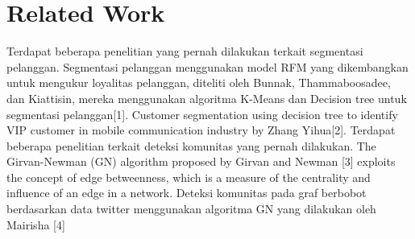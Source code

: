 \documentclass[conference]{IEEEtran}
\begin{document}
%





\section{Related Work}
Terdapat beberapa penelitian yang pernah dilakukan terkait segmentasi pelanggan. Segmentasi pelanggan menggunakan model RFM yang dikembangkan untuk mengukur loyalitas pelanggan, diteliti oleh Bunnak, Thammaboosadee, dan Kiattisin, mereka menggunakan algoritma K-Means dan Decision tree untuk segmentasi pelanggan[1]. Customer segmentation using decision tree to identify VIP customer in mobile communication industry by Zhang Yihua[2]. Terdapat beberapa penelitian terkait deteksi komunitas yang pernah dilakukan. The Girvan-Newman (GN) algorithm proposed by Girvan and Newman [3] exploits the concept of edge betweenness, which is a measure of the centrality and influence of an edge in a network. Deteksi komunitas pada graf berbobot berdasarkan data twitter menggunakan algoritma GN yang dilakukan oleh Mairisha [4]
\end{document}
